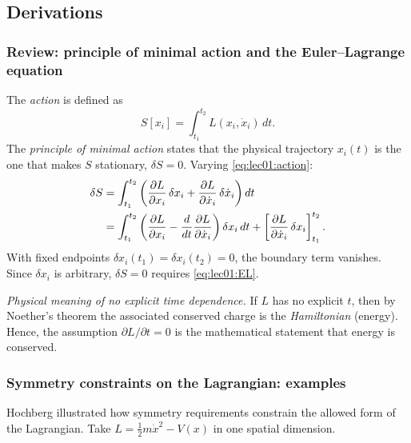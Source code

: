 \subsection*{Derivations}

\subsubsection*{Review: principle of minimal action and the
Euler–Lagrange equation}

The \emph{action} is defined as
\begin{equation}
  S[x_i] = \int_{t_1}^{t_2} L(x_i, \dot{x}_i)\,dt.
  \label{eq:lec01:action}
\end{equation}
The \emph{principle of minimal action} states that the physical
trajectory $x_i(t)$ is the one that makes $S$ stationary,
$\delta S = 0$.  Varying \eqref{eq:lec01:action}:
\begin{align}
  \delta S
  &= \int_{t_1}^{t_2}
     \left(
       \frac{\partial L}{\partial x_i}\,\delta x_i
       + \frac{\partial L}{\partial \dot{x}_i}\,\delta \dot{x}_i
     \right) dt \notag\\
  &= \int_{t_1}^{t_2}
     \left(
       \frac{\partial L}{\partial x_i}
       - \frac{d}{dt}\frac{\partial L}{\partial \dot{x}_i}
     \right)\delta x_i\,dt
     + \left[\frac{\partial L}{\partial \dot{x}_i}\,\delta x_i
       \right]_{t_1}^{t_2}.
\label{eq:lec01:deltaS}
\end{align}
With fixed endpoints $\delta x_i(t_1)=\delta x_i(t_2)=0$, the
boundary term vanishes.  Since $\delta x_i$ is arbitrary, $\delta S=0$
requires \eqref{eq:lec01:EL}.

\noindent\textit{Physical meaning of no explicit time dependence.}
If $L$ has no explicit $t$, then by Noether's theorem the associated
conserved charge is the \emph{Hamiltonian} (energy).  Hence, the
assumption $\partial L/\partial t = 0$ is the mathematical statement
that energy is conserved.

\subsubsection*{Symmetry constraints on the Lagrangian: examples}

Hochberg illustrated how symmetry requirements constrain the allowed
form of the Lagrangian.  Take
$L = \tfrac{1}{2}m\dot{x}^2 - V(x)$ in one spatial dimension.

